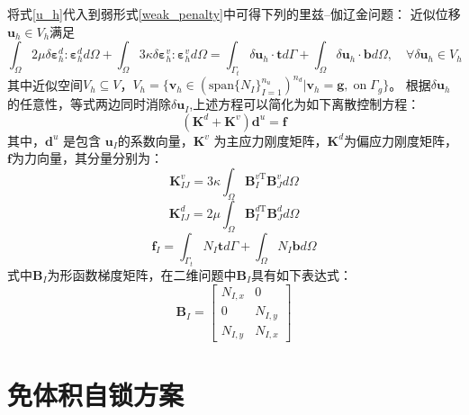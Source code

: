 将式\eqref{u_h}代入到弱形式\eqref{weak_penalty}中可得下列的里兹--伽辽金问题：
近似位移 $\boldsymbol u_h \in V_h$满足
\begin{equation}\label{ritz_penalty}
\int_\Omega 2\mu \delta \boldsymbol \varepsilon^d_h : \boldsymbol \varepsilon^d_h d\Omega +
\int_\Omega 3\kappa \delta \boldsymbol \varepsilon^v_h : \boldsymbol \varepsilon^v_h d\Omega =
\int_{\Gamma_t} \delta \boldsymbol u_h \cdot \boldsymbol t d\Gamma + \int_\Omega \delta \boldsymbol u_h \cdot \boldsymbol b d\Omega, \quad
\forall \delta \boldsymbol u_h \in V_h
\end{equation}
其中近似空间$V_h \subseteq V$，$V_h = \{\boldsymbol v_h \in (\mathrm{span}\{N_I\}_{I=1}^{n_u})^{n_d} \vert \boldsymbol v_h = \boldsymbol g,\; \mathrm{on} \; \Gamma_g\}$。
根据$\delta \boldsymbol u_h$的任意性，等式两边同时消除$\delta \boldsymbol u_I$,上述方程可以简化为如下离散控制方程：
\begin{equation}\label{equilibrium_penalty}
    (\boldsymbol K^d +\boldsymbol K^v) \boldsymbol d^u = \boldsymbol f
\end{equation}
其中，$\boldsymbol d^u$ 是包含 $\boldsymbol u_I$的系数向量，$\boldsymbol K^v$ 为主应力刚度矩阵，$\boldsymbol K^d$为偏应力刚度矩阵，$\boldsymbol f$为力向量，其分量分别为：
\begin{equation}\label{stiffness_vol}
    \boldsymbol K^v_{IJ}=  3\kappa\int_{\Omega} \boldsymbol B^{v\mathrm T}_I \boldsymbol B^v_J d\Omega
\end{equation}
\begin{equation}\label{stiffness_dev}
    \boldsymbol K^d_{IJ}= 2\mu\int_{\Omega} \boldsymbol B^{d\mathrm T}_I \boldsymbol B^d_J d\Omega
\end{equation}
\begin{equation}
    \boldsymbol f_I = \int_{\Gamma_t} N_I \boldsymbol t d\Gamma + \int_{\Omega} N_I \boldsymbol b d\Omega
\end{equation}
式中$\boldsymbol B_I$为形函数梯度矩阵，在二维问题中$\boldsymbol B_I$具有如下表达式：
\begin{equation}\label{strain vector}
    \pmb{B}_I= \left[\begin{matrix}N_{I,x}&0\\0&N_{I,y}\\N_{I,y}&N_{I,x} \end{matrix}\right] 
\end{equation}
\section{免体积自锁方案}

